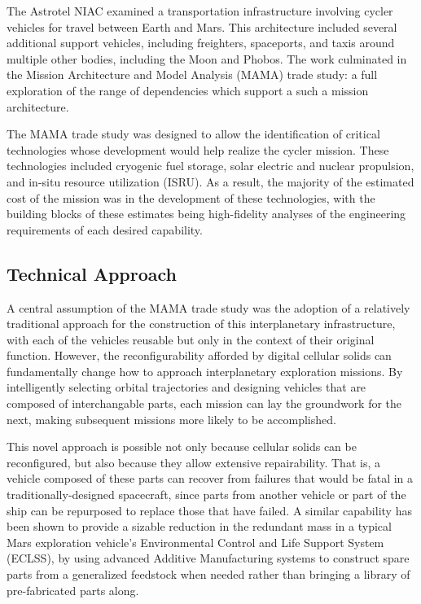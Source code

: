 \documentclass[NIACPhase1B.tex]{subfiles}
\begin{document}
The Astrotel NIAC examined a transportation infrastructure involving cycler vehicles for travel between Earth and Mars. This architecture included several additional support vehicles, including freighters, spaceports, and taxis around multiple other bodies, including the Moon and Phobos. The work culminated in the Mission Architecture and Model Analysis (MAMA) trade study: a full exploration of the range of dependencies which support a such a mission architecture.

The MAMA trade study was designed to allow the identification of critical technologies whose development would help realize the cycler mission. These technologies included cryogenic fuel storage, solar electric and nuclear propulsion, and in-situ resource utilization (ISRU). As a result, the majority of the estimated cost of the mission was in the development of these technologies, with the building blocks of these estimates being high-fidelity analyses of the engineering requirements of each desired capability. 

\subsection{Technical Approach}
A central assumption of the MAMA trade study was the adoption of a relatively traditional approach for the construction of this interplanetary infrastructure, with each of the vehicles reusable but only in the context of their original function. However, the reconfigurability afforded by digital cellular solids can fundamentally change how to approach interplanetary exploration missions. By intelligently selecting orbital trajectories and designing vehicles that are composed of interchangable parts, each mission can lay the groundwork for the next, making subsequent missions more likely to be accomplished.

This novel approach is possible not only because cellular solids can be reconfigured, but also because they allow extensive repairability. That is, a vehicle composed of these parts can recover from failures that would be fatal in a traditionally-designed spacecraft, since parts from another vehicle or part of the ship can be repurposed to replace those that have failed. A similar capability has been shown to provide a sizable reduction in the redundant mass in a typical Mars exploration vehicle's Environmental Control and Life Support System (ECLSS), by using advanced Additive Manufacturing systems to construct spare parts from a generalized feedstock when needed rather than bringing a library of pre-fabricated parts along. 
\end{document}
